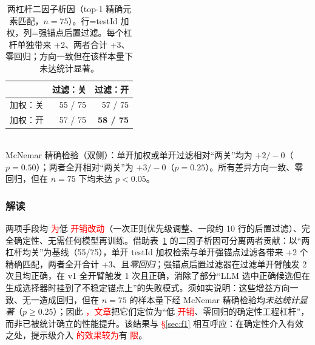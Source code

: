 \documentclass[UTF8, a4paper, 10.5pt, twocolumn, fontset=none]{ctexart}
\providecommand{\DIFaddbegin}{} %
\providecommand{\DIFaddend}{} %
\providecommand{\DIFaddtex}[1]{\textcolor{red}{#1}} %
\providecommand{\DIFaddbeginFL}{} %
\providecommand{\DIFaddendFL}{} %
\providecommand{\DIFadd}[1]{\texorpdfstring{\DIFaddtex{#1}}{#1}} %
\providecommand{\DIFaddincludegraphics}[2][]{{\color{blue}\fbox{\DIFOincludegraphics[#1]{#2}}}} %
\DeclareRobustCommand{\DIFaddbegin}{\DIFOaddbegin \let\includegraphics\DIFaddincludegraphics} %
\DeclareRobustCommand{\DIFaddend}{\DIFOaddend \let\includegraphics\DIFOincludegraphics} %
\DeclareRobustCommand{\DIFaddbeginFL}{\DIFOaddbeginFL \let\includegraphics\DIFaddincludegraphics} %
\DeclareRobustCommand{\DIFaddendFL}{\DIFOaddendFL \let\includegraphics\DIFOincludegraphics} %
\begin{document}
\begin{table}[H]
\DIFaddendFL \centering
\caption{L3 v0 $\to$ v1 端到端对比（75 个可达 koenig 失效）。v1 = v0 + testId 加权检索 + 强锚点后置过滤；v0 为两杠杆均关的统一权重基线。}
\label{tab:l3-levers}
\small
 \DIFaddbeginFL {}
\DIFaddendFL \end{table}

 \DIFaddbegin \begin{table}[H]
\DIFaddendFL \centering
\caption{两杠杆二因子析因（top-1 精确元素匹配，$n=75$）。行=testId 加权，列=强锚点后置过滤。每个杠杆单独带来 +2、两者合计 +3、零回归；方向一致但在该样本量下未达统计显著。}
\label{tab:l3-factorial}
\small
\begin{tabular}{lrr}
\toprule
 & 过滤：关 & 过滤：开 \\
\midrule
加权：关 & 55 / 75 & 57 / 75 \\
加权：开 & 57 / 75 & \textbf{58 / 75} \\
\bottomrule
\end{tabular}
\\[2pt]
{\scriptsize McNemar 精确检验（双侧）：单开加权或单开过滤相对“两关”均为 $+2/-0$（$p=0.50$）；两者全开相对“两关”为 $+3/-0$（$p=0.25$）。所有差异方向一致、零回归，但在 $n=75$ 下均未达 $p<0.05$。}
\end{table}

\subsubsection{解读}
两项手段均 \DIFaddbegin \DIFadd{为}\DIFaddend 低 \DIFaddbegin \DIFadd{开销改动}\DIFaddend （一次正则优先级调整、一段约 10 行的后置过滤）、完全确定性、无需任何模型再训练。借助表~\ref{tab:l3-factorial} 的二因子析因可分离两者贡献：以“两杠杆均关”为基线（55/75），单开 testId 加权检索与单开强锚点过滤各带来 +2 个精确匹配，两者全开合计 +3、且\emph{零回归}；强锚点后置过滤器在过滤单开臂触发 2 次且均正确，在 v1 全开臂触发 1 次且正确，消除了部分“LLM 选中正确候选但在生成选择器时挂到了不稳定锚点上”的失败模式。须如实说明：这些增益方向一致、无一造成回归，但在 $n=75$ 的样本量下经 McNemar 精确检验均\emph{未达统计显著}（$p\ge0.25$）；因此 \DIFaddbegin \DIFadd{，文章}\DIFaddend 把它们定位为“低 \DIFaddbegin \DIFadd{开销}\DIFaddend 、零回归的确定性工程杠杆”，而非已被统计确立的性能提升。该结果与  \DIFaddbegin \DIFadd{\S\ref{sec:f1} }\DIFaddend 相互呼应：在确定性介入有效之处，提示级介入 \DIFaddbegin \DIFadd{的效果较为}\DIFaddend 有 \DIFaddbegin \DIFadd{限}\DIFaddend 。
\end{document}
